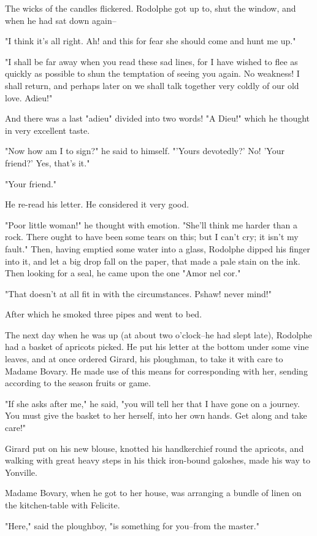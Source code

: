 \documentclass{tufte-book}
\begin{document}
The wicks of the candles flickered. Rodolphe got up to, shut the window,
and when he had sat down again--

"I think it's all right. Ah! and this for fear she should come and hunt
me up."

"I shall be far away when you read these sad lines, for I have wished to
flee as quickly as possible to shun the temptation of seeing you again.
No weakness! I shall return, and perhaps later on we shall talk together
very coldly of our old love. Adieu!"

And there was a last "adieu" divided into two words! "A Dieu!" which he
thought in very excellent taste.

"Now how am I to sign?" he said to himself. "'Yours devotedly?' No!
'Your friend?' Yes, that's it."

"Your friend."

He re-read his letter. He considered it very good.

"Poor little woman!" he thought with emotion. "She'll think me harder
than a rock. There ought to have been some tears on this; but I can't
cry; it isn't my fault." Then, having emptied some water into a glass,
Rodolphe dipped his finger into it, and let a big drop fall on the
paper, that made a pale stain on the ink. Then looking for a seal, he
came upon the one "Amor nel cor."

"That doesn't at all fit in with the circumstances. Pshaw! never mind!"

After which he smoked three pipes and went to bed.

The next day when he was up (at about two o'clock--he had slept late),
Rodolphe had a basket of apricots picked. He put his letter at
the bottom under some vine leaves, and at once ordered Girard, his
ploughman, to take it with care to Madame Bovary. He made use of this
means for corresponding with her, sending according to the season fruits
or game.

"If she asks after me," he said, "you will tell her that I have gone on
a journey. You must give the basket to her herself, into her own hands.
Get along and take care!"

Girard put on his new blouse, knotted his handkerchief round the
apricots, and walking with great heavy steps in his thick iron-bound
galoshes, made his way to Yonville.

Madame Bovary, when he got to her house, was arranging a bundle of linen
on the kitchen-table with Felicite.

"Here," said the ploughboy, "is something for you--from the master."
\end{document}
